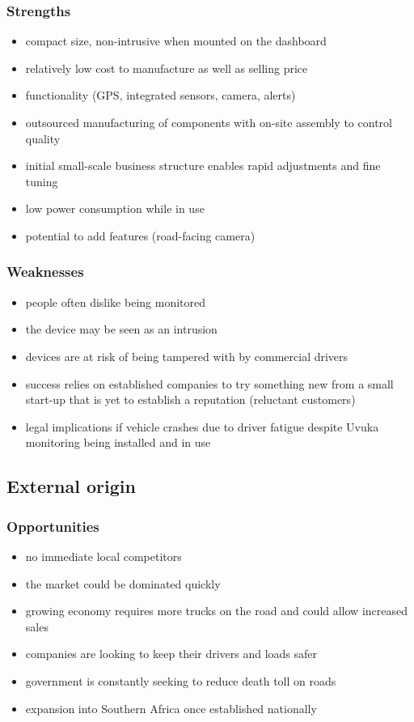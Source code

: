\subsubsection{Strengths}
\vskip8pt
\begin{itemize}
\item compact size, non-intrusive when mounted on the dashboard
\item relatively low cost to manufacture as well as selling price
\item functionality (GPS, integrated sensors, camera, alerts)
\item outsourced manufacturing of components with on-site assembly to control quality
\item initial small-scale business structure enables rapid adjustments and fine tuning
\item low power consumption while in use
\item potential to add features (road-facing camera)
\end{itemize}
\vskip15pt
\subsubsection{Weaknesses}
\vskip8pt
\begin{itemize}
\item people often dislike being monitored
\item the device may be seen as an intrusion
\item devices are at risk of being tampered with by commercial drivers
\item success relies on established companies to try something new from a small start-up that is yet to establish a reputation (reluctant customers)
\item legal implications if vehicle crashes due to driver fatigue despite Uvuka monitoring being installed and in use
\end{itemize}
\vskip15pt
\subsection{External origin}
\subsubsection{Opportunities}
\vskip8pt
\begin{itemize}
\item no immediate local competitors
\item the market could be dominated quickly
\item growing economy requires more trucks on the road and could allow increased sales
\item companies are looking to keep their drivers and loads safer
\item government is constantly seeking to reduce death toll on roads
\item expansion into Southern Africa once established nationally
\end{itemize}

